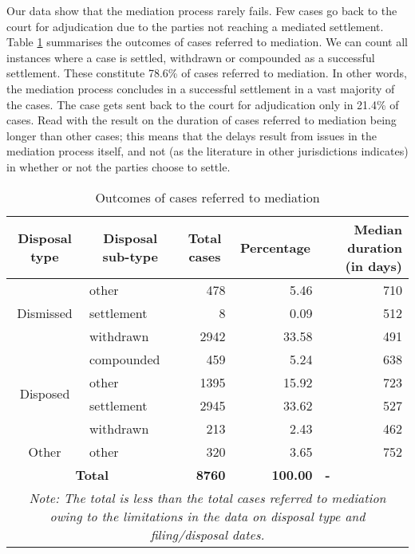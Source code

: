 Our data show that the mediation process rarely fails. Few cases go
back to the court for adjudication due to the parties not reaching a
mediated settlement. Table \ref{tab:mediation} summarises the outcomes
of cases referred to mediation. We can count all instances where a
case is settled, withdrawn or compounded as a successful
settlement. These constitute 78.6\% of cases referred to mediation. In
other words, the mediation process concludes in a successful
settlement in a vast majority of the cases. The case gets sent back to
the court for adjudication only in 21.4\% of cases. Read with the
result on the duration of cases referred to mediation being longer
than other cases; this means that the delays result from issues in the
mediation process itself, and not (as the literature in other
jurisdictions indicates) in whether or not the parties choose to
settle.

{\footnotesize \begin{longtable}{@{}clrrr@{}}
    \caption{Outcomes of cases referred to mediation}
    \label{tab:mediation}\\
    \toprule
    \textbf{Disposal type} & \multicolumn{1}{c}{\textbf{Disposal sub-type}} & \multicolumn{1}{c}{\textbf{Total cases}} & \multicolumn{1}{c}{\textbf{Percentage}} & \multicolumn{1}{p{3cm}}{\textbf{Median duration (in days)}} \\
    \midrule \endhead
    \multirow{3}{*}{Dismissed} & other & 478 & 5.46 & 710 \\
    & settlement & 8 & 0.09 & 512 \\
    & withdrawn & 2942 & 33.58 & 491 \\
    \midrule
    \multirow{4}{*}{Disposed} & compounded & 459 & 5.24 & 638 \\
    & other & 1395 & 15.92 & 723 \\
    & settlement & 2945 & 33.62 & 527 \\
    & withdrawn & 213 & 2.43 & 462 \\
    \midrule
    Other & other & 320 & 3.65 & 752 \\
    \midrule
    \multicolumn{2}{c}{\textbf{Total}} & \textbf{8760} & \textbf{100.00} & \multicolumn{1}{l}{\textbf{-}} \\
    \bottomrule \multicolumn{5}{p{11cm}}{{\footnotesize \emph{Note:
          The total is less than the total cases referred to mediation
          owing to the limitations in the data on disposal type and
          filing/disposal dates.}}}
  \end{longtable}}

